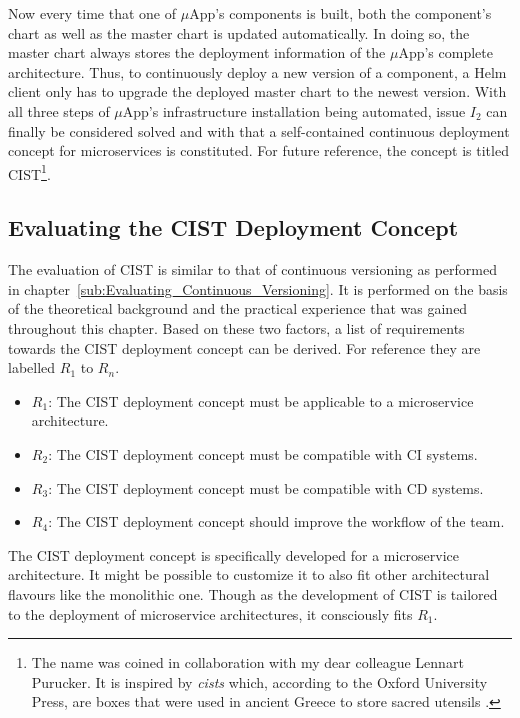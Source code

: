 Now every time that one of $\mu$App's components is built, both the component's
chart as well as the master chart is updated automatically. In doing so, the
master chart always stores the deployment information of the $\mu$App's
complete architecture. Thus, to continuously deploy a new version of a
component, a Helm client only has to upgrade the deployed master chart to the
newest version. With all three steps of $\mu$App's infrastructure installation
being automated, issue $I_2$ can finally be considered solved and with that a
self-contained continuous deployment concept for microservices is constituted.
For future reference, the concept is titled \ac{CIST}\footnote{The name was
coined in collaboration with my dear colleague Lennart Purucker. It is inspired
by \textit{cists} which, according to the Oxford University Press, are boxes
that were used in ancient Greece to store sacred utensils
\autocite{Presscist}.}.

\subsection{Evaluating the \acf{CIST} Deployment Concept}%
\label{sub:Evaluating_the_CIST_Deployment_Concept}

The evaluation of \ac{CIST} is similar to that of continuous versioning as
performed in chapter~\ref{sub:Evaluating_Continuous_Versioning}. It is
performed on the basis of the theoretical background and the practical
experience that was gained throughout this chapter. Based on these two factors,
a list of requirements towards the \ac{CIST} deployment concept can be derived.
For reference they are labelled $R_1$ to $R_n$.

\begin{itemize}
  \item \textit{$R_1$}: The \ac{CIST} deployment concept must be applicable to
    a microservice architecture.
  \item \textit{$R_2$}: The \ac{CIST} deployment concept must be compatible
    with \ac{CI} systems.
  \item \textit{$R_3$}: The \ac{CIST} deployment concept must be compatible
    with \ac{CD} systems.
  \item \textit{$R_4$}: The \ac{CIST} deployment concept should improve the
    workflow of the team.
\end{itemize}

The \ac{CIST} deployment concept is specifically developed for a microservice
architecture. It might be possible to customize it to also fit other
architectural flavours like the monolithic one. Though as the development of
\ac{CIST} is tailored to the deployment of microservice architectures, it
consciously fits $R_1$.

